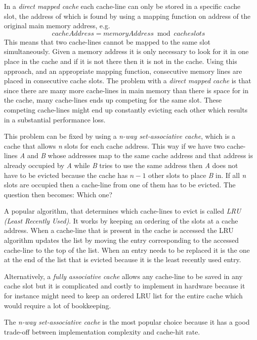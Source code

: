 In a \textit{direct mapped cache} each cache-line can only be stored in a specific cache slot, the address of which is found by using a mapping function on address of the original main memory address, e.g.
\[cacheAddress = memoryAddress\bmod cacheslots\]
This means that two cache-lines cannot be mapped to the same slot simultaneously.
Given a memory address it is only necessary to look for it in one place in the cache and if it is not there then it is not in the cache. Using this approach, and an appropriate mapping function, consecutive memory lines are placed in consecutive cache slots. 
The problem with a \textit{direct mapped cache} is that since there are many more cache-lines in main memory than there is space for in the cache, many cache-lines ends up competing for the same slot. 
These competing cache-lines might end up constantly evicting each other which results in a substantial performance loss.

This problem can be fixed by using a \textit{n-way set-associative cache}, which is a cache that allows \textit{n} slots for each cache address.
This way if we have two cache-lines \textit{A} and \textit{B} whose addresses map to the same cache address and that address is already occupied by \textit{A} while \textit{B} tries to use the same address then \textit{A} does not have to be evicted because the cache has $n-1$ other slots to place \textit{B} in.
If all \textit{n} slots are occupied then a cache-line from one of them has to be evicted.
The question then becomes: Which one?

A popular algorithm, that determines which cache-lines to evict is called \textit{LRU (Least Recently Used)}.
It works by keeping an ordering of the slots at a cache address.
When a cache-line that is present in the cache is accessed the LRU algorithm updates the list by moving the entry corresponding to the accessed cache-line to the top of the list.
When an entry needs to be replaced it is the one at the end of the list that is evicted because it is the least recently used entry.

Alternatively, a \textit{fully associative cache} allows any cache-line to be saved in any cache slot but it is complicated and costly to implement in hardware because it for instance  might need to keep an ordered LRU list for the entire cache which would require a lot of bookkeeping.

The \textit{n-way set-associative cache} is the most popular choice because it has a good trade-off between implementation complexity and cache-hit rate.


